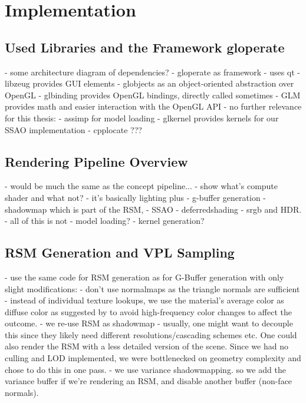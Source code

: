 

\chapter{Implementation}

\section{Used Libraries and the Framework gloperate}


- some architecture diagram of dependencies?
- gloperate as framework
    - uses qt
- libzeug provides GUI elements
- globjects as an object-oriented abstraction over OpenGL
- glbinding provides OpenGL bindings, directly called sometimes
- GLM provides math and easier interaction with the OpenGL API
- no further relevance for this thesis:
    - assimp for model loading
    - glkernel provides kernels for our SSAO implementation
    - cpplocate ???

\section{Rendering Pipeline Overview}
- would be much the same as the concept pipeline...
- show what's compute shader and what not?
- it's basically lighting plus
    - g-buffer generation
    - shadowmap which is part of the RSM,
    - SSAO
    - deferredshading
    - srgb and HDR.
    - all of this is not
- model loading?
- kernel generation?


\section{RSM Generation and VPL Sampling}
\label{sec:impl:rsmAndVplSampling}
- use the same code for RSM generation as for G-Buffer generation with only slight modifications:
- don't use normalmaps as the triangle normals are sufficient
- instead of individual texture lookups, we use the material's average color as diffuse color as suggested by \citet{hedman2016sequential} to avoid high-frequency color changes to affect the outcome.
- we re-use RSM as shadowmap
    - usually, one might want to decouple this since they likely need different resolutions/cascading schemes etc. One could also render the RSM with a less detailed version of the scene. Since we had no culling and LOD implemented, we were bottlenecked on geometry complexity and chose to do this in one pass.
    - we use variance shadowmapping. so we add the variance buffer if we're rendering an RSM, and disable another buffer (non-face normals).


